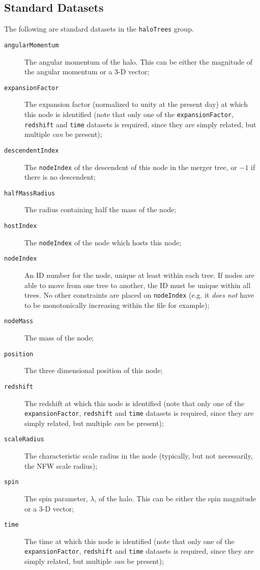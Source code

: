 \subsection{Standard Datasets}

The following are standard datasets in the {\tt haloTrees} group.

\begin{description}
 \item [{\tt angularMomentum}] The angular momentum of the halo. This can be either the magnitude of the angular momentum or a 3-D vector;
 \item [{\tt expansionFactor}] The expansion factor (normalized to unity at the present day) at which this node is identified (note that only one of the {\tt expansionFactor}, {\tt redshift} and {\tt time} datasets is required, since they are simply related, but multiple \emph{can} be present);
 \item [{\tt descendentIndex}] The {\tt nodeIndex} of the descendent of this node in the merger tree, or $-1$ if there is no descendent;
 \item [{\tt halfMassRadius}] The radius containing half the mass of the node;
 \item [{\tt hostIndex}] The {\tt nodeIndex} of the node which hosts this node;
 \item [{\tt nodeIndex}] An ID number for the node, unique at least within each tree. If nodes are able to move from one tree to another, the ID must be unique within all trees. No other constraints are placed on {\tt nodeIndex} (e.g. it \emph{does not} have to be monotonically increasing within the file for example);
 \item [{\tt nodeMass}] The mass of the node;
 \item [{\tt position}] The three dimensional position of this node;
 \item [{\tt redshift}] The redshift at which this node is identified (note that only one of the {\tt expansionFactor}, {\tt redshift} and {\tt time} datasets is required, since they are simply related, but multiple \emph{can} be present);
 \item [{\tt scaleRadius}] The characteristic scale radius in the node (typically, but not necessarily, the NFW scale radius);
 \item [{\tt spin}] The spin parameter, $\lambda$, of the halo. This can be either the spin magnitude or a 3-D vector;
 \item [{\tt time}] The time at which this node is identified (note that only one of the {\tt expansionFactor}, {\tt redshift} and {\tt time} datasets is required, since they are simply related, but multiple \emph{can} be present);

\end{description}
